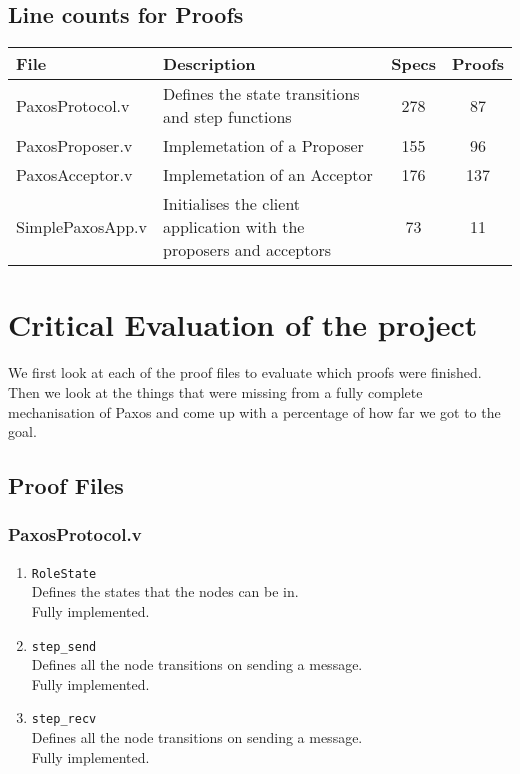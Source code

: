 \vspace{-5mm}
\subsection{Line counts for Proofs}
\begin{center}
\begin{tabular}{ |l|p{8cm}|c|c| }
\hline
File & Description & Specs & Proofs\\
\hline
PaxosProtocol.v & Defines the state transitions and step functions & 278 & 87 \\
PaxosProposer.v & Implemetation of a Proposer & 155 & 96 \\
PaxosAcceptor.v & Implemetation of an Acceptor &176 & 137 \\
SimplePaxosApp.v & Initialises the client application with the proposers and acceptors & 73 & 11 \\
\hline
\end{tabular}
\end{center}

\vspace{-5mm}
\section{Critical Evaluation of the project}
We first look at each of the proof files to evaluate which proofs
were finished. Then we look at the things that were missing from a fully
complete mechanisation of Paxos and come up with a percentage of how far we
got to the goal.

\subsection{Proof Files}

\subsubsection{PaxosProtocol.v}
\begin{enumerate}
  \item \texttt{RoleState} \\
  Defines the states that the nodes can be in. \\
  Fully implemented.
  \item \texttt{step\_send} \\
  Defines all the node transitions on sending a message. \\
  Fully implemented.
  \item \texttt{step\_recv} \\
  Defines all the node transitions on sending a message. \\
  Fully implemented.
\end{enumerate}

